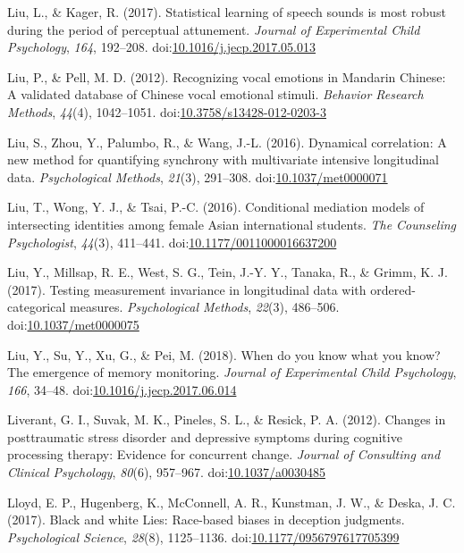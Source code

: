\documentclass[english,man]{apa6}
\begin{document}
\hypertarget{ref-Liu2017}{}
Liu, L., \& Kager, R. (2017). Statistical learning of speech sounds is
most robust during the period of perceptual attunement. \emph{Journal of
Experimental Child Psychology}, \emph{164}, 192--208.
doi:\href{https://doi.org/10.1016/j.jecp.2017.05.013}{10.1016/j.jecp.2017.05.013}

\hypertarget{ref-Liu2012}{}
Liu, P., \& Pell, M. D. (2012). Recognizing vocal emotions in Mandarin
Chinese: A validated database of Chinese vocal emotional stimuli.
\emph{Behavior Research Methods}, \emph{44}(4), 1042--1051.
doi:\href{https://doi.org/10.3758/s13428-012-0203-3}{10.3758/s13428-012-0203-3}

\hypertarget{ref-Liu2016a}{}
Liu, S., Zhou, Y., Palumbo, R., \& Wang, J.-L. (2016). Dynamical
correlation: A new method for quantifying synchrony with multivariate
intensive longitudinal data. \emph{Psychological Methods}, \emph{21}(3),
291--308.
doi:\href{https://doi.org/10.1037/met0000071}{10.1037/met0000071}

\hypertarget{ref-Liu2016c}{}
Liu, T., Wong, Y. J., \& Tsai, P.-C. (2016). Conditional mediation
models of intersecting identities among female Asian international
students. \emph{The Counseling Psychologist}, \emph{44}(3), 411--441.
doi:\href{https://doi.org/10.1177/0011000016637200}{10.1177/0011000016637200}

\hypertarget{ref-Liu2017b}{}
Liu, Y., Millsap, R. E., West, S. G., Tein, J.-Y. Y., Tanaka, R., \&
Grimm, K. J. (2017). Testing measurement invariance in longitudinal data
with ordered-categorical measures. \emph{Psychological Methods},
\emph{22}(3), 486--506.
doi:\href{https://doi.org/10.1037/met0000075}{10.1037/met0000075}

\hypertarget{ref-Liu2018}{}
Liu, Y., Su, Y., Xu, G., \& Pei, M. (2018). When do you know what you
know? The emergence of memory monitoring. \emph{Journal of Experimental
Child Psychology}, \emph{166}, 34--48.
doi:\href{https://doi.org/10.1016/j.jecp.2017.06.014}{10.1016/j.jecp.2017.06.014}

\hypertarget{ref-Liverant2012}{}
Liverant, G. I., Suvak, M. K., Pineles, S. L., \& Resick, P. A. (2012).
Changes in posttraumatic stress disorder and depressive symptoms during
cognitive processing therapy: Evidence for concurrent change.
\emph{Journal of Consulting and Clinical Psychology}, \emph{80}(6),
957--967. doi:\href{https://doi.org/10.1037/a0030485}{10.1037/a0030485}

\hypertarget{ref-Lloyd2017}{}
Lloyd, E. P., Hugenberg, K., McConnell, A. R., Kunstman, J. W., \&
Deska, J. C. (2017). Black and white Lies: Race-based biases in
deception judgments. \emph{Psychological Science}, \emph{28}(8),
1125--1136.
doi:\href{https://doi.org/10.1177/0956797617705399}{10.1177/0956797617705399}
\end{document}
